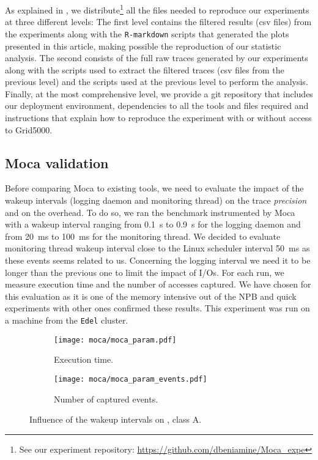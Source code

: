 As explained in , we distribute\footnote{
    See our experiment repository:
    \url{https://github.com/dbeniamine/Moca_expe}
} all the files needed to reproduce our experiments at three different levels:
The first level contains the filtered results (csv files) from the experiments along with the \texttt{R-markdown} scripts that generated the plots presented in this article, making possible the reproduction of our statistic analysis.
The second consists of the full raw traces generated by our experiments along with the scripts used to extract the filtered traces (csv files from the previous level) and the scripts used at the previous level to perform the analysis.
Finally, at the most comprehensive level, we provide a git repository that includes our deployment environment, dependencies to all the tools and files required and instructions that explain how to reproduce the experiment with or without access to \gls{Grid5000}.


\subsection{Moca validation}
\label{sec:expe-param}

Before comparing \gls{Moca} to existing tools, we need to evaluate the impact of the wakeup intervals (logging daemon and monitoring thread) on the trace \emph{precision} and on the overhead.
To do so, we ran the \IS benchmark instrumented by \gls{Moca} with a wakeup interval ranging from \SI{0.1}{s} to  \SI{0.9}{s} for the logging daemon and from \SI{20}{ms} to \SI{100}{ms} for the monitoring thread.
We decided to evaluate monitoring thread wakeup interval close to the \gls{Linux} scheduler interval \SI{50}{ms} as these events seems related to us.
Concerning the logging interval we need it to be longer than the previous one to limit the impact of \glspl{I/O}.
For each run, we measure \IS execution time and the number of accesses captured.
We have chosen \IS for this evaluation as it is one of the memory intensive out of the \gls{NPB} and quick experiments with other ones confirmed these results.
This experiment was run on a machine from the \texttt{Edel} cluster.

\begin{figure}[htb]
    \centering
    \begin{subfigure}{.73\linewidth}
        \texttt{[image: moca/moca\_param.pdf]}
        \caption{Execution time.}
        \label{fig:param_time}
    \end{subfigure}
    \begin{subfigure}{.73\linewidth}
        \texttt{[image: moca/moca\_param\_events.pdf]}
        \caption{Number of captured events.}
        \label{fig:param_evts}
    \end{subfigure}
    \caption[Influence of Moca wakeup intervals.]{Influence of the wakeup intervals on \IS, class A.}
    \label{fig:param}
\end{figure}

